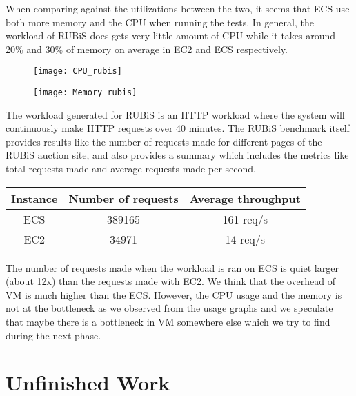\documentclass[11pt]{article}
\begin{document}
When comparing against the utilizations between the two, it seems that ECS use both more memory and the CPU when running the tests. In general, the workload of RUBiS does gets very little amount of CPU while it takes around 20\% and 30\% of memory on average in EC2 and ECS respectively.

\begin{figure}
\centering
\begin{minipage}{.5\textwidth}
  \centering
  \texttt{[image: CPU\_rubis]}
  \label{ECS-CPU}
\end{minipage}%
\begin{minipage}{.5\textwidth}
  \centering
  \texttt{[image: Memory\_rubis]}
  \label{fig:test2}
\end{minipage}
\end{figure}

The workload generated for RUBiS is an HTTP workload where the system will continuously make HTTP requests over 40 minutes. The RUBiS benchmark itself provides results like the number of requests made for different pages of the RUBiS auction site, and also provides a summary which includes the metrics like total requests made and average requests made per second. 



\begin{center}

 \begin{tabular}{||c c c ||} 
 \hline
 Instance & Number of requests & Average throughput  \\ [0.5ex] 
 \hline\hline
 ECS & 389165 & 161 req/s  \\ 
 \hline
 EC2 & 34971 & 14 req/s \\ [1ex] 
 \hline
\end{tabular}
\end{center}

The number of requests made when the workload is ran on ECS is quiet larger (about 12x) than the requests made with EC2. We think that the overhead of VM is much higher than the ECS. However, the CPU usage and the memory is not at the bottleneck as we observed from the usage graphs and we speculate that maybe there is a bottleneck in VM somewhere else which we try to find during the next phase.  

\section{Unfinished Work}
\end{document}
